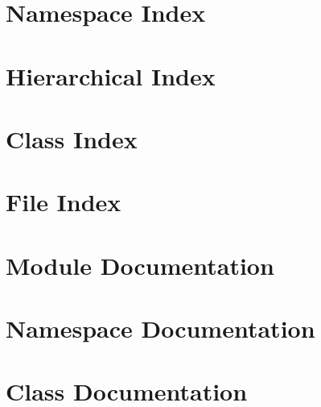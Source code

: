 \documentclass[twoside]{book}
\newcommand{\+}{\discretionary{\mbox{\scriptsize$\hookleftarrow$}}{}{}}
\begin{document}
\chapter{Namespace Index}

\chapter{Hierarchical Index}

\chapter{Class Index}

\chapter{File Index}

\chapter{Module Documentation}

\chapter{Namespace Documentation}




\chapter{Class Documentation}



































\end{document}
